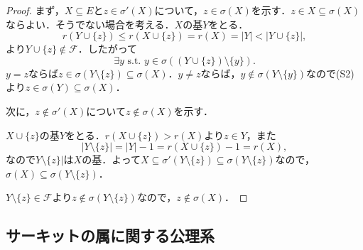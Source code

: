 \documentclass[xelatex,ja=standard,a4paper,14pt,everyparhook=compat]{bxjsarticle}
\theoremstyle{definition}
\begin{document}
\begin{proof}
    まず，$X \subseteq E$と$z \in \sigma'(X)$について，$z \in \sigma(X)$を示す．$z \in X \subseteq \sigma(X)$ならよい．そうでない場合を考える．$X$の基$Y$をとる． \begin{equation*}
        r(Y \cup \{z\}) \leq r(X \cup \{z\}) = r(X) = |Y| < |Y \cup \{z\}|,
    \end{equation*}
    より$Y \cup \{z\} \notin \mathcal{F}$．したがって \begin{equation*}
        \text{$\exists y$ s.t. $y \in \sigma((Y \cup \{z\}) \setminus \{y\})$.}
    \end{equation*}
    $y = z$ならば$z \in \sigma(Y \setminus \{z\}) \subseteq \sigma(X)$．$y \neq z$ならば，$y \notin \sigma(Y \setminus \{y\})$なので(S2)より$z \in \sigma(Y) \subseteq \sigma(X)$．

    次に，$z \notin \sigma'(X)$について$z \notin \sigma(X)$を示す．

    $X \cup \{z\}$の基$Y$をとる．$r(X \cup \{z\}) > r(X)$より$z \in Y$，また \begin{equation*}
        |Y \setminus \{z\}| = |Y| - 1 = r(X \cup \{z\}) - 1 = r(X),
    \end{equation*}
    なので$Y \setminus \{z\}|$は$X$の基．よって$X \subseteq \sigma'(Y \setminus \{z\}) \subseteq \sigma(Y \setminus \{z\})$なので，$\sigma(X) \subseteq \sigma(Y \setminus \{z\})$．

    $Y \setminus \{z\} \in \mathcal{F}$より$z \notin \sigma(Y \setminus \{z\})$なので，$z \notin \sigma(X)$．
\end{proof}

\newpage

\subsection*{サーキットの属に関する公理系}
\end{document}
